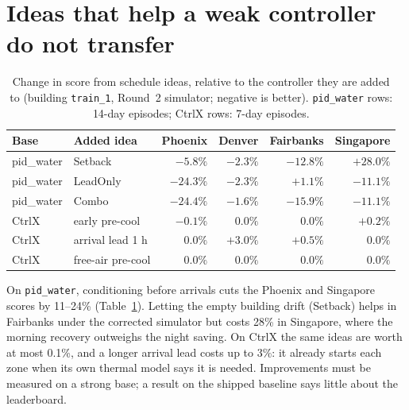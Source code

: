 \documentclass{article}
\begin{document}
\section{Ideas that help a weak controller do not transfer}\label{sec:ablation}

\begin{table}[t]
\centering
\caption{Change in score from schedule ideas, relative to the controller they are added to (building \texttt{train\_1}, Round~2 simulator; negative is better). \texttt{pid\_water} rows: 14-day episodes; CtrlX rows: 7-day episodes.}
\label{tab:ablation}
\small
\begin{tabular}{llrrrr}
\toprule
Base & Added idea & Phoenix & Denver & Fairbanks & Singapore \\
\midrule
pid\_water & Setback        & $-5.8\%$ & $-2.3\%$ & $-12.8\%$ & $+28.0\%$ \\
pid\_water & LeadOnly       & $-24.3\%$ & $-2.3\%$ & $+1.1\%$ & $-11.1\%$ \\
pid\_water & Combo          & $-24.4\%$ & $-1.6\%$ & $-15.9\%$ & $-11.1\%$ \\
\midrule
CtrlX & early pre-cool          & $-0.1\%$ & $0.0\%$ & $0.0\%$ & $+0.2\%$ \\
CtrlX & arrival lead 1 h        & $0.0\%$ & $+3.0\%$ & $+0.5\%$ & $0.0\%$ \\
CtrlX & free-air pre-cool       & $0.0\%$ & $0.0\%$ & $0.0\%$ & $0.0\%$ \\
\bottomrule
\end{tabular}
\end{table}

On \texttt{pid\_water}, conditioning before arrivals cuts the Phoenix and Singapore scores by 11--24\% (Table~\ref{tab:ablation}). Letting the empty building drift (Setback) helps in Fairbanks under the corrected simulator but costs 28\% in Singapore, where the morning recovery outweighs the night saving. On CtrlX the same ideas are worth at most 0.1\%, and a longer arrival lead costs up to 3\%: it already starts each zone when its own thermal model says it is needed. Improvements must be measured on a strong base; a result on the shipped baseline says little about the leaderboard.
\end{document}
